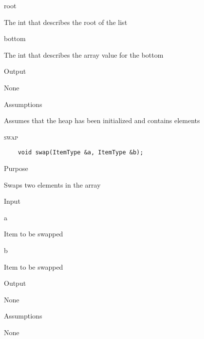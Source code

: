 \documentclass[pdftex, 12pt]{article}
\begin{document}
\begin{description}
\begin{description}
				\begin{description}

					\item{root}
							
						The int that describes the root of the list

					\item{bottom}

						The int that describes the array value for the bottom

				\end{description}
						
			\item{Output}

				None

			\item{Assumptions}
				
				Assumes that the heap has been initialized and contains elements

		\end{description}
	\item{\textsc{swap}}
\begin{lstlisting}
	void swap(ItemType &a, ItemType &b);
\end{lstlisting}
		\begin{description}

			\item{Purpose}

				Swaps two elements in the array

			\item{Input}

				\begin{description}

					\item{a}

						Item to be swapped

					\item{b}

						Item to be swapped

				\end{description}

			\item{Output}

				None

			\item{Assumptions}

				None

		\end{description}
\end{description}
\end{document}
